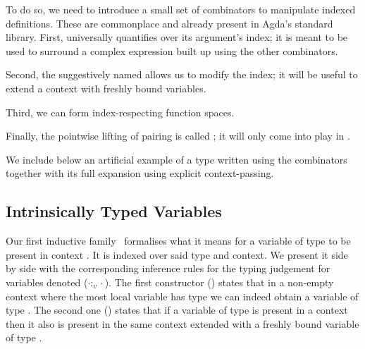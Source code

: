 To do so, we need to introduce a small set of combinators
to manipulate indexed definitions. These are commonplace
and already present in Agda's standard library.
%
First,  universally quantifies over its argument's index;
it is meant to be used to surround a complex expression built
up using the other combinators.


Second, the suggestively named  allows us to modify
the index; it will be useful to extend a context with freshly
bound variables.


Third, we can form index-respecting function spaces.


Finally, the pointwise lifting of pairing is called ;
it will only come into play in .


We include below an artificial example of a type written using
the combinators together with its full expansion using explicit
context-passing.

\begin{AgdaSuppressSpace}
\end{AgdaSuppressSpace}

\subsection{Intrinsically Typed Variables}

Our first inductive family~\cite{DBLP:journals/fac/Dybjer94} formalises
what it means for a variable of type  to be present in context .
It is indexed over said type and context.
We present it side by side
with the corresponding inference rules for the typing judgement
for variables denoted ($\cdot :_v \cdot$).
%
The first constructor () states that in a non-empty context
where the most local variable has type  we can indeed obtain a
variable of type .
%
The second one () states that if a variable of type 
is present in a context then it also is present in the same context
extended with a freshly bound variable of type .


